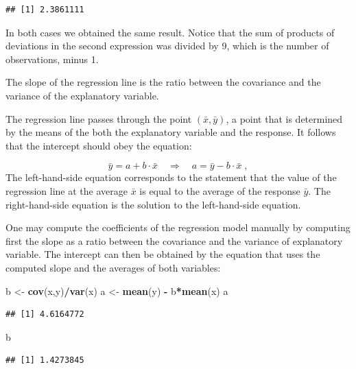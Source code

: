 \documentclass[]{krantz}
\makeatletter
\newenvironment{Shaded}{\begin{snugshade}}{\end{snugshade}}
\newcommand{\KeywordTok}[1]{\textcolor[rgb]{0.13,0.29,0.53}{\textbf{#1}}}
\newcommand{\NormalTok}[1]{#1}
\newcommand{\OperatorTok}[1]{\textcolor[rgb]{0.81,0.36,0.00}{\textbf{#1}}}
\newcommand{\StringTok}[1]{\textcolor[rgb]{0.31,0.60,0.02}{#1}}
\newenvironment{kframe}{%
\medskip{}
\setlength{\fboxsep}{.8em}
 \def\at@end@of@kframe{}%
 \ifinner\ifhmode%
  \def\at@end@of@kframe{\end{minipage}}%
  \begin{minipage}{\columnwidth}%
 \fi\fi%
 \def\FrameCommand##1{\hskip\@totalleftmargin \hskip-\fboxsep
 \colorbox{shadecolor}{##1}\hskip-\fboxsep
     \hskip-\linewidth \hskip-\@totalleftmargin \hskip\columnwidth}%
 \MakeFramed {\advance\hsize-\width
   \@totalleftmargin\z@ \linewidth\hsize
   \@setminipage}}%
 {\par\unskip\endMakeFramed%
 \at@end@of@kframe}
\renewenvironment{Shaded}{\begin{kframe}}{\end{kframe}}
\theoremstyle{definition}
\theoremstyle{definition}
\theoremstyle{definition}
\theoremstyle{remark}
\makeatother
\begin{document}
\begin{verbatim}
## [1] 2.3861111
\end{verbatim}

In both cases we obtained the same result. Notice that the sum of
products of deviations in the second expression was divided by 9, which
is the number of observations, minus 1.

The slope of the regression line is the ratio between the covariance and
the variance of the explanatory variable.

The regression line passes through the point \((\bar x, \bar y)\), a point
that is determined by the means of the both the explanatory variable and
the response. It follows that the intercept should obey the equation:

\[\bar y = a + b\cdot \bar x \quad\Longrightarrow\quad a = \bar y - b\cdot \bar x\;,\]
The left-hand-side equation corresponds to the statement that the value
of the regression line at the average \(\bar x\) is equal to the average
of the response \(\bar y\). The right-hand-side equation is the solution
to the left-hand-side equation.

One may compute the coefficients of the regression model manually by
computing first the slope as a ratio between the covariance and the
variance of explanatory variable. The intercept can then be obtained by
the equation that uses the computed slope and the averages of both
variables:

\begin{Shaded}
\begin{Highlighting}[]
\NormalTok{b <-}\StringTok{ }\KeywordTok{cov}\NormalTok{(x,y)}\OperatorTok{/}\KeywordTok{var}\NormalTok{(x)}
\NormalTok{a <-}\StringTok{ }\KeywordTok{mean}\NormalTok{(y) }\OperatorTok{-}\StringTok{ }\NormalTok{b}\OperatorTok{*}\KeywordTok{mean}\NormalTok{(x)}
\NormalTok{a}
\end{Highlighting}
\end{Shaded}

\begin{verbatim}
## [1] 4.6164772
\end{verbatim}

\begin{Shaded}
\begin{Highlighting}[]
\NormalTok{b}
\end{Highlighting}
\end{Shaded}

\begin{verbatim}
## [1] 1.4273845
\end{verbatim}
\end{document}
